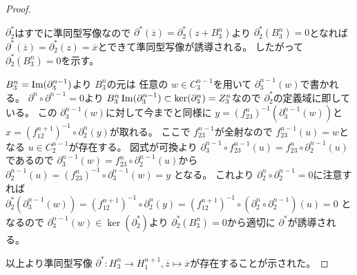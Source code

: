 \documentclass[dvipdfmx]{jsarticle}
\begin{document}
\begin{proof}
\begin{center}
  \end{center}

  $\partial^*_2$はすでに準同型写像なので $\partial^*(\overline{z}) = \partial^*_2(z + B^n_3)$より $\partial^*_2(B^n_3) = 0$となれば
  $\partial^*(\overline{z}) = \partial^*_2(z) = \overline{x}$とできて準同型写像が誘導される。
  したがって $\partial^*_2(B^n_3) = 0$を示す。

  $B^n_3 = \mathop{\mathrm{Im}}\nolimits(\partial^{n-1}_3)$より $B^n_3$の元は
  任意の $w \in C^{n-1}_3$を用いて $\partial^{n-1}_3(w)$で書かれる。
  $\partial^n \circ \partial^{n-1} = 0$より $B^n_3 \mathop{\mathrm{Im}}\nolimits(\partial^{n-1}_3) \subset \ker(\partial^n_3) = Z^n_3$なので $\partial^*_2$の定義域に即している。
  この $\partial^{n-1}_3(w)$に対して今までと同様に
  $y = (f_{23}^n)^{-1}(\partial^{n-1}_3(w))$と
  $x = (f_{12}^{n+1})^{-1} \circ \partial^n_2(y)$が取れる。
  ここで $f_{23}^{n-1}$が全射なので $f_{23}^{n-1}(u) = w$となる $u \in C^{n-1}_2$が存在する。
  図式が可換より $\partial^{n-1}_3 \circ f_{23}^{n-1}(u) = f_{23}^n \circ \partial^{n-1}_2(u)$であるので
  $\partial^{n-1}_3(w) = f_{23}^n \circ \partial^{n-1}_2(u)$から
  $\partial^{n-1}_2(u) = (f_{23}^n)^{-1} \circ \partial^{n-1}_3(w) = y$
  となる。
  これより $\partial^n_2 \circ \partial^{n-1}_2 = 0$に注意すれば
  $\partial^*_2(\partial^{n-1}_3(w)) = (f_{12}^{n+1})^{-1} \circ \partial^n_2(y) = (f_{12}^{n+1})^{-1} \circ (\partial^n_2 \circ \partial^{n-1}_2)(u) = 0$
  となるので $\partial^{n-1}_3(w) \in \ker(\partial^*_2)$より
  $\partial^*_2(B^n_3) = 0$から適切に $\partial^*$が誘導される。

  以上より準同型写像 $\partial^* : H^n_3 \longrightarrow H^{n+1}_1 , \overline{z} \longmapsto \overline{x}$が存在することが示された。
\end{proof}
\end{document}
